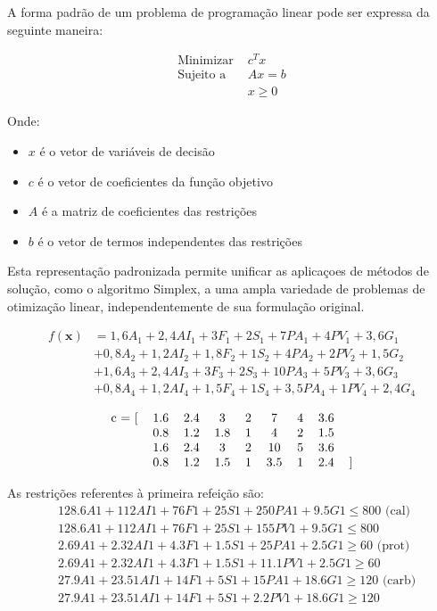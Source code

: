 \documentclass{article}
\begin{document}
A forma padrão de um problema de programação linear pode ser expressa da seguinte maneira:

\begin{align*}
\text{Minimizar } & c^T x \\
\text{Sujeito a } & Ax = b \\
& x \geq 0
\end{align*}

Onde:
\begin{itemize}
    \item $x$ é o vetor de variáveis de decisão
    \item $c$ é o vetor de coeficientes da função objetivo
    \item $A$ é a matriz de coeficientes das restrições
    \item $b$ é o vetor de termos independentes das restrições
\end{itemize}

Esta representação padronizada permite unificar as aplicaçoes de métodos de solução, como o algoritmo Simplex, a uma ampla variedade de problemas de otimização linear, independentemente de sua formulação original.


\begin{equation}
\begin{aligned}
f(\boldsymbol{x}) &=  1,6A_1 + 2,4AI_1 + 3F_1 + 2S_1 + 7PA_1 + 4PV_1 + 3,6G_1 \\
& + 0,8A_2 + 1,2AI_2 + 1,8F_2 + 1S_2 + 4PA_2 + 2PV_2 + 1,5G_2 \\
& + 1,6A_3 + 2,4AI_3 + 3F_3 + 2S_3 + 10PA_3 + 5PV_3 + 3,6G_3 \\
& + 0,8A_4 + 1,2AI_4 + 1,5F_4 + 1S_4 + 3,5PA_4 + 1PV_4 + 2,4G_4
\end{aligned}
\end{equation}

\begin{equation}
\begin{tabular}{ccccccccc}
c = [& 1.6 & 2.4 & 3 & 2 & 7 & 4 & 3.6 &  \\
& 0.8 & 1.2 & 1.8 & 1 & 4 & 2 & 1.5 &  \\
& 1.6 & 2.4 & 3 & 2 & 10 & 5 & 3.6 &  \\
& 0.8 & 1.2 & 1.5 & 1 & 3.5 & 1 & 2.4 & ]
\end{tabular}
\end{equation}

As restrições referentes à primeira refeição são:
\begin{align*}
& 128.6A1 + 112AI1 + 76F1 + 25S1 + 250PA1 + 9.5G1 \leq 800 \text{ (cal)} \\
& 128.6A1 + 112AI1 + 76F1 + 25S1 + 155PV1 + 9.5G1 \leq 800 \\
& 2.69A1 + 2.32AI1 + 4.3F1 + 1.5S1 + 25PA1 + 2.5G1 \geq 60 \text{ (prot)} \\
& 2.69A1 + 2.32AI1 + 4.3F1 + 1.5S1 + 11.1PV1 + 2.5G1 \geq 60 \\
& 27.9A1 + 23.51AI1 + 14F1 + 5S1 + 15PA1 + 18.6G1 \geq 120 \text{ (carb)} \\
& 27.9A1 + 23.51AI1 + 14F1 + 5S1 + 2.2PV1 + 18.6G1 \geq 120
\end{align*}
\end{document}
